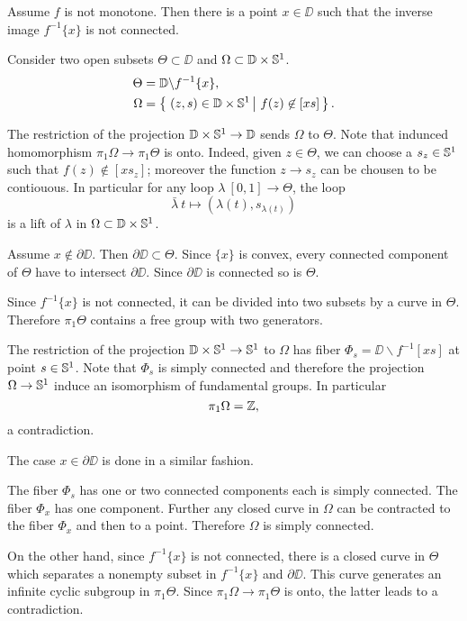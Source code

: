 Assume $f$ is not monotone.
Then there is a point $x\in \DD$ such that the inverse image $f^{-1}\{x\}$ is not connected.

Consider two open subsets $\Theta\subset\DD$ and $\Omega\subset \mathbb{D}\times\mathbb{S}^1$.
\begin{align*}
\Theta&=\DD\backslash f^{-1}\{x\},
\\
\Omega&=\set{(z,s)\in \DD\times\SS^1}{f(z)\not\in [xs]}.
\end{align*}

The restriction of the projection $\mathbb{D}\times\mathbb{S}^1\to \mathbb{D}$ sends $\Omega$ to $\Theta$.
Note that indunced homomorphism $\pi_1\Omega\to \pi_1\Theta$ is onto.
Indeed, given $z\in \Theta$, we can choose a $s_z\in\mathbb{S}^1$ such that 
$f(z)\notin [xs_z]$;
moreover the function $z\to s_z$ can be chousen to be contiouous.
In particular for any loop $\lambda\:[0,1]\to\Theta$, the loop 
\[\bar\lambda\:t\mapsto (\lambda(t),s_{\lambda(t)})\]
is a lift of $\lambda$ in $\Omega\subset \mathbb{D}\times\mathbb{S}^1$.

Assume $x\notin\partial\DD$.
Then $\partial\DD\subset \Theta$.
Since $\{x\}$ is convex, every connected component of $\Theta$ have to intersect $\partial\DD$.
Since $\partial\DD$ is connected so is $\Theta$.

Since $f^{-1}\{x\}$ is not connected, it can be divided into two subsets by a curve in $\Theta$.
Therefore $\pi_1\Theta$ contains a free group with two generators.

The restriction of the projection $\mathbb{D}\times\mathbb{S}^1\to \mathbb{S}^1$ to $\Omega$ has fiber 
$\Phi_s=\DD\backslash f^{-1}[xs]$ at point $s\in\mathbb{S}^1$.
Note that $\Phi_s$ is simply connected and therefore the projection $\Omega\to \mathbb{S}^1$ induce an isomorphism of fundamental groups.
In particular 
\[\pi_1\Omega=\mathbb{Z},\]
a contradiction.

The case $x\in\partial\DD$ is done in a similar fashion.

The fiber $\Phi_s$ has one or two connected components each is simply connected.
The fiber $\Phi_x$ has one component.
Further any closed curve in $\Omega$ can be contracted to the fiber $\Phi_x$ and then to a point.
Therefore $\Omega$ is simply connected.

On the other hand, since $f^{-1}\{x\}$ is not connected, there is a closed curve in $\Theta$ which separates a nonempty subset in $f^{-1}\{x\}$ and $\partial \DD$. 
This curve generates an infinite cyclic subgroup in $\pi_1\Theta$.
Since $\pi_1\Omega\to \pi_1\Theta$ is onto, the latter leads to a contradiction.
\qeds

